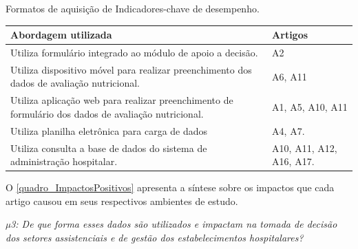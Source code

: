 \begin{quadro}[htb]
\caption{\label{quadro_indicadoresArtigos}Formatos de aquisição de Indicadores-chave de desempenho.}
\label{}
\begin{tabular}{|p{11cm}|p{4cm}|}
	\hline
	\textbf{Abordagem utilizada}   &   \textbf{Artigos}\\ \hline
	Utiliza formulário integrado ao módulo de apoio a decisão. &  A2\\ \hline
	Utiliza dispositivo móvel para realizar preenchimento dos dados de avaliação nutricional. & A6, A11\\ \hline
	Utiliza aplicação web para realizar preenchimento de formulário dos dados de avaliação nutricional. & A1, A5, A10, A11\\ \hline
	Utiliza planilha eletrônica para carga de dados & A4, A7.\\ \hline
	Utiliza consulta a base de dados do sistema de administração hospitalar. & A10, A11, A12, A16, A17.\\ \hline
\end{tabular}
\end{quadro}

O \autoref{quadro_ImpactosPositivos} apresenta a síntese sobre os impactos que cada artigo causou em seus respectivos ambientes de estudo. 
\newline

\textit{µ3: De que forma esses dados são utilizados e impactam na tomada de decisão dos setores assistenciais e de gestão dos estabelecimentos hospitalares?}

